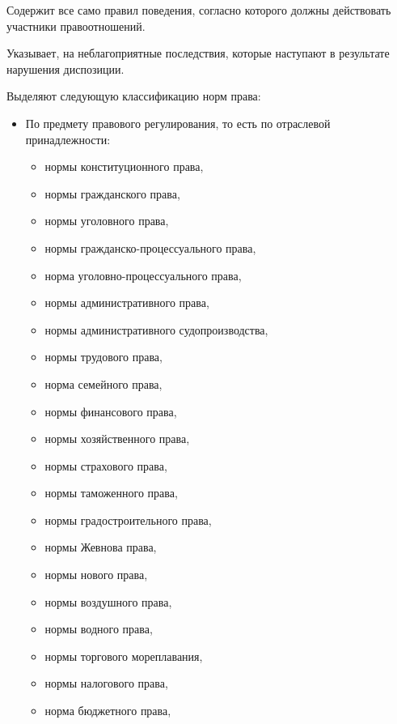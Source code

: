 \begin{definition}[Диспозиция]\label{def:disposition}
	Содержит все само правил поведения, согласно которого должны
	действовать участники правоотношений.
\end{definition}

\begin{definition}[Санкция]\label{def:sanction}
	Указывает, на неблагоприятные последствия, которые наступают в
	результате нарушения диспозиции.
\end{definition}

Выделяют следующую классификацию норм права:

\begin{itemize}
	\item По предмету правового регулирования, то есть по отраслевой
	      принадлежности:
	      \begin{itemize}
		      \item нормы конституционного права,
		      \item нормы гражданского права,
		      \item нормы уголовного права,
		      \item нормы гражданско-процессуального права,
		      \item норма уголовно-процессуального права,
		      \item нормы административного права,
		      \item нормы административного судопроизводства,
		      \item нормы трудового права,
		      \item норма семейного права,
		      \item нормы финансового права,
		      \item нормы хозяйственного права,
		      \item нормы страхового права,
		      \item нормы таможенного права,
		      \item нормы градостроительного права,
		      \item нормы Жевнова права,
		      \item нормы нового права,
		      \item нормы воздушного права,
		      \item нормы водного права,
		      \item нормы торгового мореплавания,
		      \item нормы налогового права,
		      \item норма бюджетного права,

\end{itemize}
\end{itemize}
